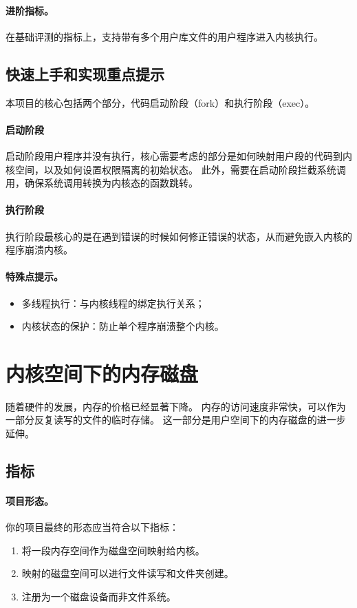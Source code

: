\paragraph*{进阶指标。}
在基础评测的指标上，支持带有多个用户库文件的用户程序进入内核执行。

\subsection{快速上手和实现重点提示}
本项目的核心包括两个部分，代码启动阶段（fork）和执行阶段（exec）。

\paragraph*{启动阶段}
启动阶段用户程序并没有执行，核心需要考虑的部分是如何映射用户段的代码到内核空间，以及如何设置权限隔离的初始状态。
此外，需要在启动阶段拦截系统调用，确保系统调用转换为内核态的函数跳转。


\paragraph*{执行阶段}
执行阶段最核心的是在遇到错误的时候如何修正错误的状态，从而避免嵌入内核的程序崩溃内核。

\paragraph*{特殊点提示。}
\begin{itemize}
    \item 多线程执行：与内核线程的绑定执行关系；
    \item 内核状态的保护：防止单个程序崩溃整个内核。
\end{itemize}

\section{内核空间下的内存磁盘}
随着硬件的发展，内存的价格已经显著下降。
内存的访问速度非常快，可以作为一部分反复读写的文件的临时存储。
这一部分是用户空间下的内存磁盘的进一步延伸。


\subsection{指标}
\paragraph*{项目形态。}
你的项目最终的形态应当符合以下指标：
\begin{enumerate}
    \item 将一段内存空间作为磁盘空间映射给内核。
    \item 映射的磁盘空间可以进行文件读写和文件夹创建。
    \item 注册为一个磁盘设备而非文件系统。
\end{enumerate}

